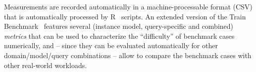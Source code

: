 Measurements are recorded automatically in a machine-processable format (CSV)
that is automatically processed by R~\cite{TB:R} scripts. An extended version of the Train
Benchmark~\cite{ASE2013} features several (instance model, query-specific and
combined) \emph{metrics} that can be used to characterize the ``difficulty'' of
benchmark cases numerically, and -- since they can be evaluated automatically
for other domain/model/query combinations -- allow to compare the benchmark
cases with other real-world workloads.
